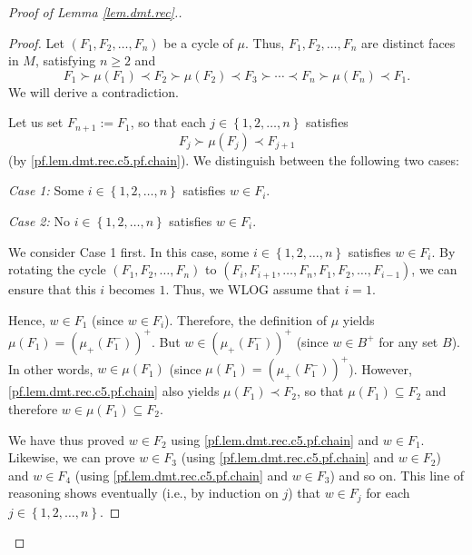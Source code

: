 \documentclass[12pt]{amsart}
\theoremstyle{definition}
\begin{document}
\begin{proof}[Proof of Lemma \ref{lem.dmt.rec}.]
\begin{proof}
Let $\left(  F_{1},F_{2},\ldots,F_{n}\right)  $ be a cycle of $\mu$. Thus,
$F_{1},F_{2},\ldots,F_{n}$ are distinct faces in $M$, satisfying $n\geq2$ and%
\begin{equation}
F_{1}\succ\mu\left(  F_{1}\right)  \prec F_{2}\succ\mu\left(  F_{2}\right)
\prec F_{3}\succ\cdots\prec F_{n}\succ\mu\left(  F_{n}\right)  \prec F_{1}.
\label{pf.lem.dmt.rec.c5.pf.chain}%
\end{equation}
We will derive a contradiction.

Let us set $F_{n+1}:=F_{1}$, so that each $j\in\left\{  1,2,\ldots,n\right\}
$ satisfies%
\begin{equation}
F_{j}\succ\mu\left(  F_{j}\right)  \prec F_{j+1}
\label{pf.lem.dmt.rec.c5.pf.1}%
\end{equation}
(by \eqref{pf.lem.dmt.rec.c5.pf.chain}). We distinguish between the following
two cases:

\textit{Case 1:} Some $i\in\left\{  1,2,\ldots,n\right\}  $ satisfies $w\in
F_{i}$.

\textit{Case 2:} No $i\in\left\{  1,2,\ldots,n\right\}  $ satisfies $w\in
F_{i}$.

We consider Case 1 first. In this case, some $i\in\left\{  1,2,\ldots
,n\right\}  $ satisfies $w\in F_{i}$. By rotating the cycle $\left(
F_{1},F_{2},\ldots,F_{n}\right)  $ to $\left(  F_{i},F_{i+1},\ldots
,F_{n},F_{1},F_{2},\ldots,F_{i-1}\right)  $, we can ensure that this $i$
becomes $1$. Thus, we WLOG assume that $i=1$.

Hence, $w\in F_{1}$ (since $w\in F_{i}$). Therefore, the definition of $\mu$
yields $\mu\left(  F_{1}\right)  =\left(  \mu_+\left(  F_{1}^-\right)
\right)  ^+$. But $w\in\left(  \mu_+\left(  F_{1}^-\right)  \right)
^+$ (since $w\in B^+$ for any set $B$). In other words, $w\in\mu\left(
F_{1}\right)  $ (since $\mu\left(  F_{1}\right)  =\left(  \mu_+\left(
F_{1}^-\right)  \right)  ^+$). However, \eqref{pf.lem.dmt.rec.c5.pf.chain}
also yields $\mu\left(  F_{1}\right)  \prec F_{2}$, so that $\mu\left(
F_{1}\right)  \subseteq F_{2}$ and therefore $w\in\mu\left(  F_{1}\right)
\subseteq F_{2}$.

We have thus proved $w\in F_{2}$ using \eqref{pf.lem.dmt.rec.c5.pf.chain} and
$w\in F_{1}$. Likewise, we can prove $w\in F_{3}$ (using
\eqref{pf.lem.dmt.rec.c5.pf.chain} and $w\in F_{2}$) and $w\in F_{4}$ (using
\eqref{pf.lem.dmt.rec.c5.pf.chain} and $w\in F_{3}$) and so on. This line of
reasoning shows eventually (i.e., by induction on $j$) that $w\in F_{j}$ for
each $j\in\left\{  1,2,\ldots,n\right\}  $.


\end{proof}
\end{proof}
\end{document}
